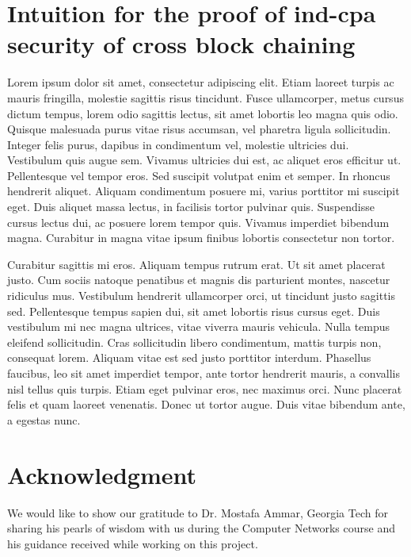 \documentclass[conference]{IEEEtran}
\begin{document}
\section{Intuition for the proof of ind-cpa security of cross block chaining}

Lorem ipsum dolor sit amet, consectetur adipiscing elit. Etiam laoreet turpis ac mauris fringilla, molestie sagittis risus tincidunt. Fusce ullamcorper, metus cursus dictum tempus, lorem odio sagittis lectus, sit amet lobortis leo magna quis odio. Quisque malesuada purus vitae risus accumsan, vel pharetra ligula sollicitudin. Integer felis purus, dapibus in condimentum vel, molestie ultricies dui. Vestibulum quis augue sem. Vivamus ultricies dui est, ac aliquet eros efficitur ut. Pellentesque vel tempor eros. Sed suscipit volutpat enim et semper. In rhoncus hendrerit aliquet. Aliquam condimentum posuere mi, varius porttitor mi suscipit eget. Duis aliquet massa lectus, in facilisis tortor pulvinar quis. Suspendisse cursus lectus dui, ac posuere lorem tempor quis. Vivamus imperdiet bibendum magna. Curabitur in magna vitae ipsum finibus lobortis consectetur non tortor.

Curabitur sagittis mi eros. Aliquam tempus rutrum erat. Ut sit amet placerat justo. Cum sociis natoque penatibus et magnis dis parturient montes, nascetur ridiculus mus. Vestibulum hendrerit ullamcorper orci, ut tincidunt justo sagittis sed. Pellentesque tempus sapien dui, sit amet lobortis risus cursus eget. Duis vestibulum mi nec magna ultrices, vitae viverra mauris vehicula. Nulla tempus eleifend sollicitudin. Cras sollicitudin libero condimentum, mattis turpis non, consequat lorem. Aliquam vitae est sed justo porttitor interdum. Phasellus faucibus, leo sit amet imperdiet tempor, ante tortor hendrerit mauris, a convallis nisl tellus quis turpis. Etiam eget pulvinar eros, nec maximus orci. Nunc placerat felis et quam laoreet venenatis. Donec ut tortor augue. Duis vitae bibendum ante, a egestas nunc.



\section*{Acknowledgment}

We would like to show our gratitude to Dr. Mostafa Ammar, Georgia Tech for sharing his pearls of wisdom with us during the Computer Networks course and his guidance received while working on this project.




\end{document}
